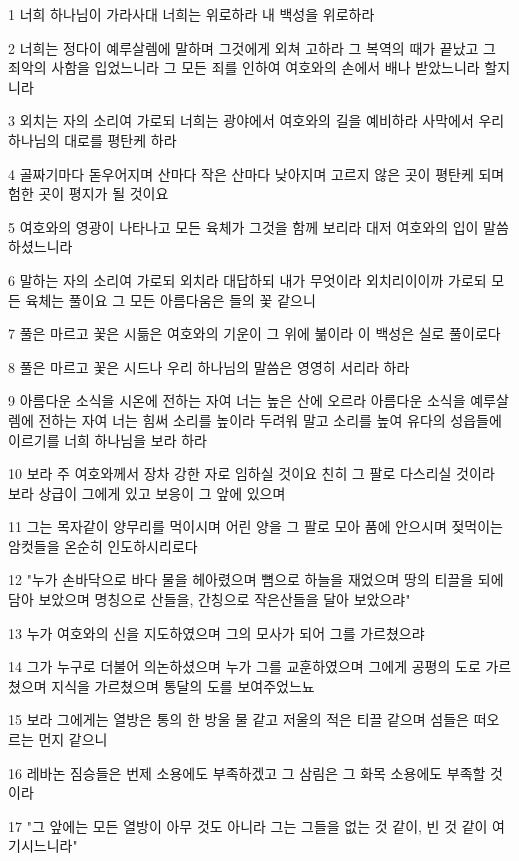 \par 1 너희 하나님이 가라사대 너희는 위로하라 내 백성을 위로하라
\par 2 너희는 정다이 예루살렘에 말하며 그것에게 외쳐 고하라 그 복역의 때가 끝났고 그 죄악의 사함을 입었느니라 그 모든 죄를 인하여 여호와의 손에서 배나 받았느니라 할지니라
\par 3 외치는 자의 소리여 가로되 너희는 광야에서 여호와의 길을 예비하라 사막에서 우리 하나님의 대로를 평탄케 하라
\par 4 골짜기마다 돋우어지며 산마다 작은 산마다 낮아지며 고르지 않은 곳이 평탄케 되며 험한 곳이 평지가 될 것이요
\par 5 여호와의 영광이 나타나고 모든 육체가 그것을 함께 보리라 대저 여호와의 입이 말씀하셨느니라
\par 6 말하는 자의 소리여 가로되 외치라 대답하되 내가 무엇이라 외치리이이까 가로되 모든 육체는 풀이요 그 모든 아름다움은 들의 꽃 같으니
\par 7 풀은 마르고 꽃은 시듦은 여호와의 기운이 그 위에 붊이라 이 백성은 실로 풀이로다
\par 8 풀은 마르고 꽃은 시드나 우리 하나님의 말씀은 영영히 서리라 하라
\par 9 아름다운 소식을 시온에 전하는 자여 너는 높은 산에 오르라 아름다운 소식을 예루살렘에 전하는 자여 너는 힘써 소리를 높이라 두려워 말고 소리를 높여 유다의 성읍들에 이르기를 너희 하나님을 보라 하라
\par 10 보라 주 여호와께서 장차 강한 자로 임하실 것이요 친히 그 팔로 다스리실 것이라 보라 상급이 그에게 있고 보응이 그 앞에 있으며
\par 11 그는 목자같이 양무리를 먹이시며 어린 양을 그 팔로 모아 품에 안으시며 젖먹이는 암컷들을 온순히 인도하시리로다
\par 12 "누가 손바닥으로 바다 물을 헤아렸으며 뼘으로 하늘을 재었으며 땅의 티끌을 되에 담아 보았으며 명칭으로 산들을, 간칭으로 작은산들을 달아 보았으랴"
\par 13 누가 여호와의 신을 지도하였으며 그의 모사가 되어 그를 가르쳤으랴
\par 14 그가 누구로 더불어 의논하셨으며 누가 그를 교훈하였으며 그에게 공평의 도로 가르쳤으며 지식을 가르쳤으며 통달의 도를 보여주었느뇨
\par 15 보라 그에게는 열방은 통의 한 방울 물 같고 저울의 적은 티끌 같으며 섬들은 떠오르는 먼지 같으니
\par 16 레바논 짐승들은 번제 소용에도 부족하겠고 그 삼림은 그 화목 소용에도 부족할 것이라
\par 17 "그 앞에는 모든 열방이 아무 것도 아니라 그는 그들을 없는 것 같이, 빈 것 같이 여기시느니라"
